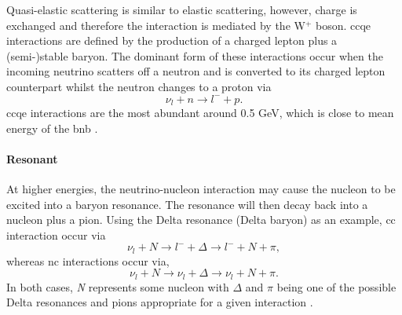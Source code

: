 Quasi-elastic scattering is similar to elastic scattering, however, charge is exchanged and therefore the interaction is mediated by the W$^+$ boson. \gls{ccqe} interactions are defined by the production of a charged lepton plus a (semi-)stable baryon. The dominant form of these interactions occur when the incoming neutrino scatters off a neutron and is converted to its charged lepton counterpart whilst the neutron changes to a proton via
\begin{equation}
    \nu_l + n \rightarrow l^- + p.
\end{equation}
\gls{ccqe} interactions are the most abundant around 0.5 GeV, which is close to mean energy of the \gls{bnb} \cite{Measurement_of_the_Antineutrino_Double-Differential_Charged-Current_Quasi-Elastic_Scattering_Cross_Section_at_MINERvA_book}. 

\paragraph{Resonant}
At higher energies, the neutrino-nucleon interaction may cause the nucleon to be excited into a baryon resonance. The resonance will then decay back into a nucleon plus a pion. Using the Delta resonance (Delta baryon) as an example, \gls{cc} interaction occur via
\begin{equation}
    \nu_l + N \rightarrow l^- + \Delta \rightarrow l^- + N + \pi,
\end{equation}
whereas \gls{nc} interactions occur via,
\begin{equation}
    \nu_l + N \rightarrow \nu_l + \Delta \rightarrow \nu_l + N +\pi.
\end{equation}
In both cases, \textit{N} represents some nucleon with $\Delta$ and $\pi$ being one of the possible Delta resonances and pions appropriate for a given interaction \cite{Measurement_of_the_Antineutrino_Double-Differential_Charged-Current_Quasi-Elastic_Scattering_Cross_Section_at_MINERvA_book} \cite{Measurement_of_the_Water_to_Scintillator_Charged-Current_Cross-Section_Ratio_for_Muon_Neutrinos_at_the_T2K_Near_Detector_thesis}. 

